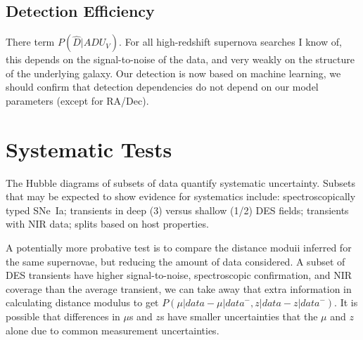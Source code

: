 \documentclass[preprint]{aastex}
\begin{document}
\subsection{Detection Efficiency}
There term $P(\hat{D}|\mathit{ADU}_V)$.  For all high-redshift supernova searches
I know of, this depends on the signal-to-noise of the data, and very weakly on the
structure of the underlying galaxy.  Our detection is now based on machine learning,
we should confirm that detection dependencies do not depend on our model parameters
(except for RA/Dec).

\section{Systematic Tests}
The Hubble diagrams of subsets of data quantify systematic uncertainty.  
Subsets that may be expected to show evidence for systematics include:
spectroscopically typed SNe~Ia; transients in deep (3) versus shallow (1/2) DES fields;
transients with NIR data; splits based on host properties.

A potentially more probative test is to compare the distance moduii inferred for the same
supernovae, but reducing the amount of data considered.  A subset of DES
transients have higher signal-to-noise, spectroscopic confirmation, and NIR coverage than
the average transient, we can take away that extra information in calculating distance modulus
to get $P(\mu | \mathit{data} - \mu | \mathit{data}^-, z | \mathit{data} - z | \mathit{data}^-)$.
It is possible that differences in $\mu$s and $z$s have smaller uncertainties that the
$\mu$ and $z$ alone due to common measurement uncertainties. 


\end{document}
